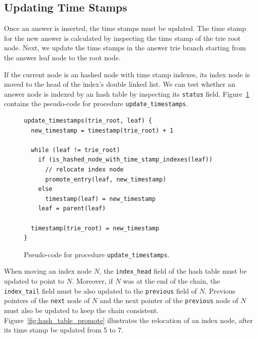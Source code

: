 \subsection{Updating Time Stamps}

Once an answer is inserted, the time stamps must be updated.
The time stamp for the new answer is calculated by inspecting the time stamp of the trie root node.
Next, we update the time stamps in the answer trie branch starting from the answer leaf node to the
root node.

If the current node is an hashed node with time stamp indexes,
its index node is moved to the head of
the index's double linked list. We can test whether an answer node is indexed by
an hash table by inspecting its \texttt{status} field.
Figure~\ref{fig:update_timestamps} contains the pseudo-code for procedure \texttt{update\_timestamps}.

\begin{figure}[ht]
\begin{Verbatim}
update_timestamps(trie_root, leaf) {
  new_timestamp = timestamp(trie_root) + 1
  
  while (leaf != trie_root)
    if (is_hashed_node_with_time_stamp_indexes(leaf))
      // relocate index node
      promote_entry(leaf, new_timestamp)
    else
      timestamp(leaf) = new_timestamp
    leaf = parent(leaf)
      
  timestamp(trie_root) = new_timestamp
}
\end{Verbatim}
\caption{Pseudo-code for procedure \texttt{update\_timestamps}.}
\label{fig:update_timestamps}
\end{figure}

When moving an index node $N$, the \texttt{index\_head} field of the hash table must be updated
to point to $N$. Moreover, if $N$ was at the end of the chain,
the \texttt{index\_tail} field must be also updated to the \texttt{previous} field of $N$.
Previous pointers of the \texttt{next} node of $N$ and the next pointer of
the \texttt{previous} node of $N$ must
also be updated to keep the chain consistent.
Figure~\ref{fig:hash_table_promote} illustrates the relocation of an index node, after
its time stamp be updated from 5 to 7.

